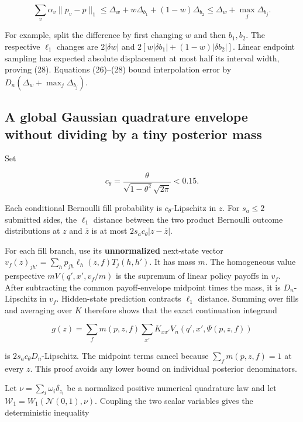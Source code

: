 \documentclass[10pt,a4paper]{article}
\begin{document}
\begin{equation}
\sum_v\alpha_v\|p_v-p\|_1
\le \Delta_w+w\Delta_{b_1}+(1-w)\Delta_{b_2}
\le\Delta_w+\max_j\Delta_{b_j}.
\tag{28}
\end{equation}

For example, split the difference by first changing $w$ and then $b_1,b_2$.
The respective $\ell_1$ changes are $2|\delta w|$ and
$2[w|\delta b_1|+(1-w)|\delta b_2|]$. Linear endpoint sampling has expected
absolute displacement at most half its interval width, proving (28).
Equations (26)--(28) bound interpolation error by
$D_n(\Delta_w+\max_j\Delta_{b_j})$.

\subsection{A global Gaussian quadrature envelope without dividing by a tiny posterior mass}

Set

\begin{equation*}
c_\theta=\frac{\theta}{\sqrt{1-\theta^2}\sqrt{2\pi}}<0.15.
\end{equation*}

Each conditional Bernoulli fill probability is $c_\theta$-Lipschitz in
$z$. For $s_a\le2$ submitted sides, the $\ell_1$ distance between
the two product Bernoulli outcome distributions at $z$ and $\bar z$
is at most $2s_ac_\theta|z-\bar z|$.

For each fill branch, use its \textbf{unnormalized} next-state vector
$v_f(z)_{jh'}=\sum_hp_{jh}\ell_h(z,f)T_j(h,h')$. It has mass $m$.
The homogeneous value perspective
$mV(q',x',v_f/m)$ is the supremum of linear policy payoffs in $v_f$.
After subtracting the common payoff-envelope midpoint times the mass, it is
$D_n$-Lipschitz in $v_f$. Hidden-state prediction contracts
$\ell_1$ distance. Summing over fills and averaging over $K$ therefore
shows that the exact continuation integrand

\begin{equation*}
g(z)=\sum_fm(p,z,f)\sum_{x'}K_{xx'}V_n(q',x',\Psi(p,z,f))
\end{equation*}

is $2s_ac_\theta D_n$-Lipschitz. The midpoint terms cancel because
$\sum_fm(p,z,f)=1$ at every $z$. This proof avoids any lower bound on
individual posterior denominators.

Let $\nu=\sum_i\omega_i\delta_{z_i}$ be a normalized positive numerical
quadrature law and let
$\mathcal W_1=W_1(\mathcal N(0,1),\nu)$. Coupling the two scalar variables
gives the deterministic inequality
\end{document}
